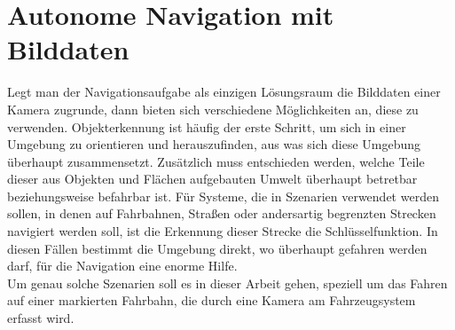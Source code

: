 \section{Autonome Navigation mit Bilddaten}
\label{sec:Autonome Navigation mit Bilddaten}
Legt man der Navigationsaufgabe als einzigen Lösungsraum die Bilddaten einer Kamera zugrunde, dann bieten sich verschiedene Möglichkeiten an, diese zu verwenden. Objekterkennung ist häufig der erste Schritt, um sich in einer Umgebung zu orientieren und herauszufinden, aus was sich diese Umgebung überhaupt zusammensetzt. Zusätzlich muss entschieden werden, welche Teile dieser aus Objekten und Flächen aufgebauten Umwelt überhaupt betretbar beziehungsweise befahrbar ist.
Für Systeme, die in Szenarien verwendet werden sollen, in denen auf Fahrbahnen, Straßen oder andersartig begrenzten Strecken navigiert werden soll, ist die Erkennung dieser Strecke die Schlüsselfunktion. In diesen Fällen bestimmt die Umgebung direkt, wo überhaupt gefahren werden darf, für die Navigation eine enorme Hilfe.\\
Um genau solche Szenarien soll es in dieser Arbeit gehen, speziell um das Fahren auf einer markierten Fahrbahn, die durch eine Kamera am Fahrzeugsystem erfasst wird.




